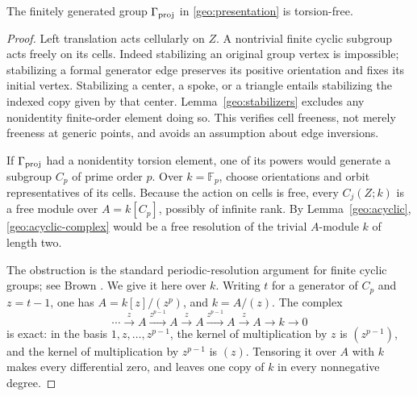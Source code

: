 \begin{proposition}
\label{geo:torsion}
The finitely generated group $\Gamma_{\mathrm{proj}}$ in \eqref{geo:presentation} is
torsion-free.
\end{proposition}

\begin{proof}
Left translation acts cellularly on $Z$.  A nontrivial finite cyclic
subgroup acts freely on its cells.  Indeed stabilizing an original group
vertex is impossible; stabilizing a formal generator edge preserves its
positive orientation and fixes its initial vertex.  Stabilizing a center,
a spoke, or a triangle entails stabilizing the indexed copy given by
that center.  Lemma~\ref{geo:stabilizers} excludes any nonidentity
finite-order element doing so.  This verifies cell freeness, not merely
freeness at generic points, and avoids an assumption about edge inversions.

If $\Gamma_{\mathrm{proj}}$ had a nonidentity torsion element, one of its powers would
generate a subgroup $C_p$ of prime order $p$.  Over $k=\mathbb F_p$,
choose orientations and orbit representatives of its cells.  Because
the action on cells is free, every $C_j(Z;k)$ is a free module over
$A=k[C_p]$, possibly of infinite rank.  By Lemma~\ref{geo:acyclic},
\eqref{geo:acyclic-complex} would be a free resolution of the trivial
$A$-module $k$ of length two.

The obstruction is the standard periodic-resolution argument for finite
cyclic groups; see Brown \cite[Examples~1.3 and~2.4(e)]{Brown2010}.
We give it here over $k$.  Writing $t$
for a generator of $C_p$ and $z=t-1$, one has
$A=k[z]/(z^p)$, and $k=A/(z)$.  The complex
\begin{equation}
 \cdots\xrightarrow{z}A\xrightarrow{z^{p-1}}A
 \xrightarrow{z}A\xrightarrow{z^{p-1}}A
 \xrightarrow{z}A\longrightarrow k\longrightarrow0
 \label{geo:periodic-resolution}
\end{equation}
is exact: in the basis $1,z,\ldots,z^{p-1}$, the kernel of multiplication
by $z$ is $(z^{p-1})$, and the kernel of multiplication by $z^{p-1}$ is
$(z)$.  Tensoring it over $A$ with $k$ makes every differential zero,
and leaves one copy of $k$ in every nonnegative degree.


\end{proof}
